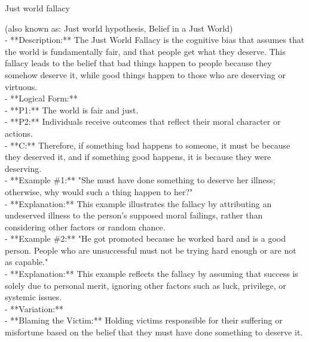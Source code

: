 \documentclass[a4paper,12pt,single,pdftex]{scrbook}
\begin{document}
  

Just world fallacy
    
      (also known as: Just world hypothesis, Belief in a Just World)
    \\

  
    
      - **Description:** The Just World Fallacy is the cognitive bias that assumes that the world is fundamentally fair, and that people get what they deserve. This fallacy leads to the belief that bad things happen to people because they somehow deserve it, while good things happen to those who are deserving or virtuous.
    \\

    
      - **Logical Form:**
    \\

    
        - **P1:** The world is fair and just.
    \\

    
        - **P2:** Individuals receive outcomes that reflect their moral character or actions.
    \\

    
        - **C:** Therefore, if something bad happens to someone, it must be because they deserved it, and if something good happens, it is because they were deserving.
    \\

    
      - **Example \#1:** "She must have done something to deserve her illness; otherwise, why would such a thing happen to her?"
    \\

    
      - **Explanation:** This example illustrates the fallacy by attributing an undeserved illness to the person’s supposed moral failings, rather than considering other factors or random chance.
    \\

    
      - **Example \#2:** "He got promoted because he worked hard and is a good person. People who are unsuccessful must not be trying hard enough or are not as capable."
    \\

    
      - **Explanation:** This example reflects the fallacy by assuming that success is solely due to personal merit, ignoring other factors such as luck, privilege, or systemic issues.
    \\

    
      - **Variation:**
    \\

    
        - **Blaming the Victim:** Holding victims responsible for their suffering or misfortune based on the belief that they must have done something to deserve it.
    \\
\end{document}
